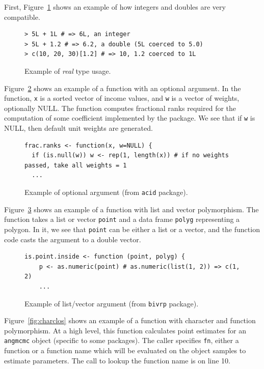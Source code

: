 \documentclass[acmsmall,10pt,review,anonymous]{acmart}\settopmatter{printfolios=true,printccs=false,printacmref=false}
\begin{document}
First, Figure~\ref{fig:realex} shows an example of how integers and doubles are very compatible.

\begin{figure}[!hb]{\small\begin{lstlisting}[style=R]
> 5L + 1L # => 6L, an integer
> 5L + 1.2 # => 6.2, a double (5L coerced to 5.0)
> c(10, 20, 30)[1.2] # => 10, 1.2 coerced to 1L
\end{lstlisting}}\caption{Example of {\it real} type usage.}\label{fig:realex}\end{figure}

Figure~\ref{fig:optnull} shows an example of a function with an optional argument.
In the function, {\tt x} is a sorted vector of income values, and {\tt w} is a vector of weights, optionally NULL.
The function computes fractional ranks required for the computation of some coefficient implemented by the package.
We see that if {\tt w} is NULL, then default unit weights are generated.

\begin{figure}[!hb]{\small\begin{lstlisting}[style=R]
frac.ranks <- function(x, w=NULL) {
  if (is.null(w)) w <- rep(1, length(x)) # if no weights passed, take all weights = 1
  ...
\end{lstlisting}}\caption{Example of optional argument (from {\tt acid} package).}\label{fig:optnull}\end{figure}

Figure~\ref{fig:listvec} shows an example of a function with list and vector polymorphism.
The function takes a list or vector {\tt point} and a data frame {\tt polyg} representing a polygon.
In it, we see that {\tt point} can be either a list or a vector, and the function code casts the argument to a double vector.

\begin{figure}[!hb]{\small\begin{lstlisting}[style=R]
is.point.inside <- function (point, polyg) {
    p <- as.numeric(point) # as.numeric(list(1, 2)) => c(1, 2)
    ...
\end{lstlisting}}\caption{Example of list/vector argument (from {\tt bivrp} package).}\label{fig:listvec}\end{figure}

Figure~\ref{fig:charclos} shows an example of a function with character and function polymorphism.
At a high level, this function calculates point estimates for an {\tt angmcmc} object (specific to some packages).
The caller specifies {\tt fn}, either a function or a function name which will be evaluated on the object samples to estimate parameters.
The call to lookup the function name is on line 10.
\end{document}
